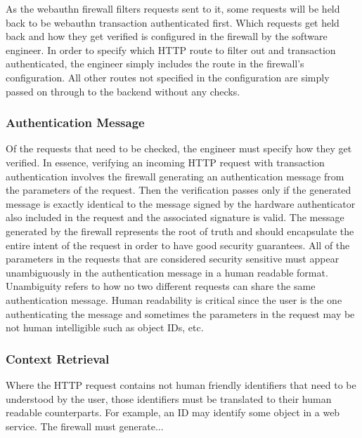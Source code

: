 As the webauthn firewall filters requests sent to it, some requests will be held back to be webauthn transaction authenticated first. Which requests get held back and how they get verified is configured in the firewall by the software engineer. In order to specify which HTTP route to filter out and transaction authenticated, the engineer simply includes the route in the firewall's configuration. All other routes not specified in the configuration are simply passed on through to the backend without any checks.

\subsubsection{Authentication Message}

Of the requests that need to be checked, the engineer must specify how they get verified. In essence, verifying an incoming HTTP request with transaction authentication involves the firewall generating an authentication message from the parameters of the request. Then the verification passes only if the generated message is exactly identical to the message signed by the hardware authenticator also included in the request and the associated signature is valid. The message generated by the firewall represents the root of truth and should encapsulate the entire intent of the request in order to have good security guarantees. All of the parameters in the requests that are considered security sensitive must appear unambiguously in the authentication message in a human readable format. Unambiguity refers to how no two different requests can share the same authentication message. Human readability is critical since the user is the one authenticating the message and sometimes the parameters in the request may be not human intelligible such as object IDs, etc.

\subsubsection{Context Retrieval}


Where the HTTP request contains not human friendly identifiers that need to be understood by the user, those identifiers must be translated to their human readable counterparts. For example, an ID may identify some object in a web service. The firewall must generate...

\iffalse
is reconfigured to issue backend requests to the IP address

Upon opening the web page, requests are issued from the web-browser

has two options to specify how a route gets verified.

This message should encapsulate 
\fi
